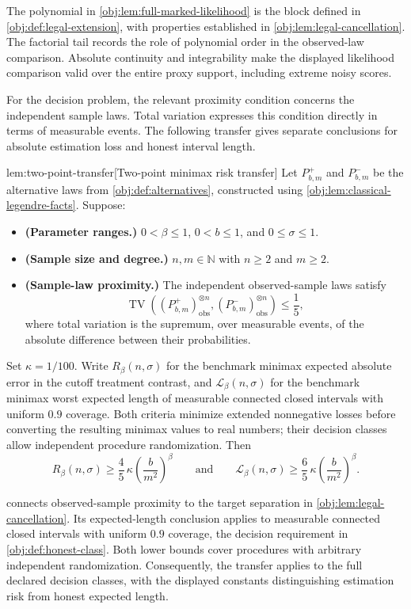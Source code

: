 The polynomial in \cref{obj:lem:full-marked-likelihood} is the block defined in \cref{obj:def:legal-extension}, with properties established in \cref{obj:lem:legal-cancellation}. The factorial tail records the role of polynomial order in the observed-law comparison. Absolute continuity and integrability make the displayed likelihood comparison valid over the entire proxy support, including extreme noisy scores.

For the decision problem, the relevant proximity condition concerns the independent sample laws. Total variation  expresses this condition directly in terms of measurable events. The following transfer gives separate conclusions for absolute estimation loss and honest interval length.

\begin{lemmav}{lem:two-point-transfer}[Two-point minimax risk transfer]
Let \(P^+_{b,m}\) and \(P^-_{b,m}\) be the alternative laws from \cref{obj:def:alternatives}, constructed using \cref{obj:lem:classical-legendre-facts}. Suppose:
\begin{itemize}
\item \textbf{(Parameter ranges.)} \(0<\beta\le1\), \(0<b\le1\), and \(0\le\sigma\le1\).
\item \textbf{(Sample size and degree.)} \(n,m\in\mathbb N\) with \(n\ge2\) and \(m\ge2\).
\item \textbf{(Sample-law proximity.)} The independent observed-sample laws satisfy
\[
\operatorname{TV}\!\left(
(P^+_{b,m})_{\mathrm{obs}}^{\otimes n},
(P^-_{b,m})_{\mathrm{obs}}^{\otimes n}
\right)\le\frac15,
\]
where total variation is the supremum, over measurable events, of the absolute difference between their probabilities.
\end{itemize}
Set \(\kappa=1/100\). Write \(R_\beta(n,\sigma)\) for the benchmark minimax expected absolute error in the cutoff treatment contrast, and \(\mathcal L_\beta(n,\sigma)\) for the benchmark minimax worst expected length of measurable connected closed intervals with uniform \(0.9\) coverage. Both criteria minimize extended nonnegative losses before converting the resulting minimax values to real numbers; their decision classes allow independent procedure randomization. Then
\[
R_\beta(n,\sigma)\ge
\frac45\,\kappa\left(\frac{b}{m^2}\right)^\beta
\qquad\text{and}\qquad
\mathcal L_\beta(n,\sigma)\ge
\frac65\,\kappa\left(\frac{b}{m^2}\right)^\beta.
\]
\end{lemmav}

 connects observed-sample proximity to the target separation in \cref{obj:lem:legal-cancellation}. Its expected-length conclusion applies to measurable connected closed intervals with uniform \(0.9\) coverage, the decision requirement in \cref{obj:def:honest-class}. Both lower bounds cover procedures with arbitrary independent randomization. Consequently, the transfer applies to the full declared decision classes, with the displayed constants distinguishing estimation risk from honest expected length.

